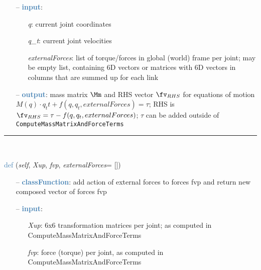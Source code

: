 \begin{itemize}[leftmargin=1.4cm]
\begin{itemize}[leftmargin=1.4cm]
\begin{itemize}[leftmargin=0.5cm]
\begin{itemize}[leftmargin=1.4cm]
\begin{itemize}[leftmargin=1.4cm]
\begin{itemize}[leftmargin=0.5cm]
\begin{itemize}[leftmargin=1.4cm]
\begin{itemize}[leftmargin=0.5cm]
\begin{itemize}[leftmargin=1.4cm]
\begin{itemize}[leftmargin=1.4cm]
\begin{itemize}[leftmargin=1.4cm]
\begin{itemize}[leftmargin=0.7cm]
\begin{itemize}[leftmargin=1.2cm]
  \end{itemize}
  \item[--]  \textcolor{steelblue}{\bf input}: \vspace{-6pt}
  \begin{itemize}[leftmargin=1.2cm]
\setlength{\itemindent}{-0.7cm}
    \item[] {\it q}: current joint coordinates
    \item[] {\it   q\_t}: current joint velocities
    \item[] {\it   externalForces}: list of torque/forces in global (world) frame per joint; may be empty list, containing 6D vectors or matrices with 6D vectors in columns that are summed up for each link
  \end{itemize}
  \item[--]  \textcolor{steelblue}{\bf output}: mass matrix $\Mm$ and RHS vector $\fv_{RHS}$ for equations of motion $M(q) \cdot q_tt + f(q,q_t,externalForces) = \tau$; RHS is $\fv_{RHS}=\tau - f(q,q_t,externalForces)$; $\tau$ can be added outside of \texttt{ComputeMassMatrixAndForceTerms}\vspace{12pt}\end{itemize}
%
\noindent\rule{8cm}{0.75pt}\vspace{1pt} \\ 
\begin{flushleft}
\noindent \textcolor{steelblue}{def {\bf {}}}\label{sec:kinematicTree:KinematicTree66:AddExternalForces}
({\it self}, {\it Xup}, {\it fvp}, {\it externalForces}= [])
\end{flushleft}
\setlength{\itemindent}{0.7cm}
\begin{itemize}[leftmargin=0.7cm]
  \item[--]  \textcolor{steelblue}{\bf classFunction}: add action of external forces to forces fvp and return new composed vector of forces fvp  \item[--]  \textcolor{steelblue}{\bf input}: \vspace{-6pt}
  \begin{itemize}[leftmargin=1.2cm]
\setlength{\itemindent}{-0.7cm}
    \item[] {\it Xup}: 6x6 transformation matrices per joint; as computed in ComputeMassMatrixAndForceTerms
    \item[] {\it   fvp}: force (torque) per joint, as computed in ComputeMassMatrixAndForceTerms

\end{itemize}
\end{itemize}
\end{itemize}
\end{itemize}
\end{itemize}
\end{itemize}
\end{itemize}
\end{itemize}
\end{itemize}
\end{itemize}
\end{itemize}
\end{itemize}
\end{itemize}

